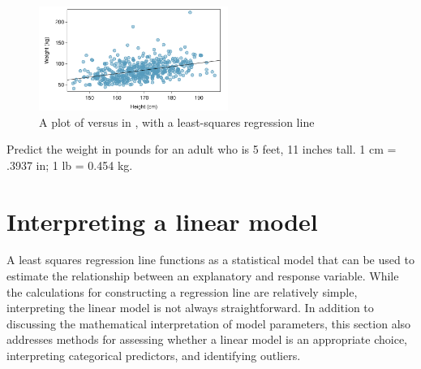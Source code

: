 \begin{figure}[h]
	\centering
	\includegraphics[width=0.55\textwidth]
	{ch_simple_linear_regression_oi_biostat/figures/nhanesHeightWeightRegress/nhanesHeightWeightRegress}
	\caption{A plot of  versus  in , with a least-squares regression line}
	\label{nhanesHeightWeightRegress}
\end{figure}

\begin{exercisewrap}
\begin{nexercise}\label{predictingNHANESWeightfrmHeightMetric}%
Predict the weight in pounds for an adult who is 5 feet, 11 inches tall. 1 cm = .3937 in; 1 lb = 0.454 kg.\footnotemark{}
\end{nexercise}
\end{exercisewrap}



\section{Interpreting a linear model}
\label{interpretingLeastSquaresLine}


A least squares regression line functions as a statistical model that can be used to estimate the relationship between an explanatory and response variable. While the calculations for constructing a regression line are relatively simple, interpreting the linear model is not always straightforward. In addition to discussing the mathematical interpretation of model parameters, this section also addresses methods for assessing whether a linear model is an appropriate choice, interpreting categorical predictors, and identifying outliers.


